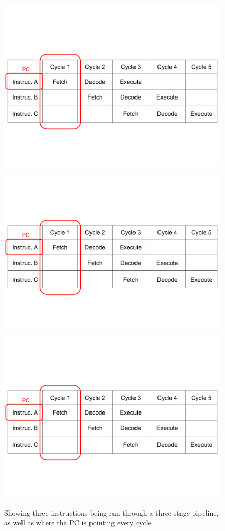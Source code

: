 \begin{figure}
\includegraphics[page=1, clip=true, trim=1mm 40mm 1mm 57mm, width=\textwidth]{./week2/pipeline}
\includegraphics[page=2, clip=true, trim=1mm 40mm 1mm 57mm, width=\textwidth]{./week2/pipeline}
\includegraphics[page=3, clip=true, trim=1mm 40mm 1mm 57mm, width=\textwidth]{./week2/pipeline}
\caption{Showing three instructions being run through a three stage pipeline, as well as where the PC is pointing every cycle}
\label{fig:pipeline}
\end{figure}
